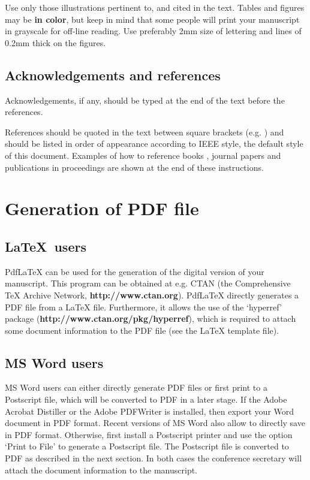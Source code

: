 \documentclass{ISMA_USD2020}
\begin{document}
Use only those illustrations pertinent to, and cited in the text. Tables and figures may be \textbf{in color}, but keep in mind that some people will print your manuscript in grayscale for off-line reading. Use preferably 2mm size of lettering and lines of 0.2mm thick on the figures. 


\subsection{Acknowledgements and references}

Acknowledgements, if any, should be typed at the end of the text before the references.

References should be quoted in the text between square brackets (e.g. \cite{heylen1997modal}) and should be listed in order of appearance according to IEEE style, the default style of this document. Examples of how to reference books \cite{heylen1997modal}, journal papers \cite{sas1995active} and publications
in proceedings \cite{boonen2001modified} are shown at the end of these instructions.

\section{Generation of PDF file \label{s:pdf}}

\subsection{\LaTeX ~users}

Pdf\LaTeX{} can be used for the generation of the digital version of your manuscript. This
program can be obtained at e.g. CTAN (the Comprehensive \TeX{} Archive Network, \textbf{http://www.ctan.org}). Pdf\LaTeX{} directly generates a PDF file from a \LaTeX{} file. Furthermore, it allows the use of the `hyperref' package (\textbf{http://www.ctan.org/pkg/hyperref}), which is required to attach some document information to the PDF file (see the \LaTeX{} template file).

\subsection{MS Word users}

MS Word users can either directly generate PDF files or first print to a Postscript file, which will be converted to PDF in a later stage. If the Adobe Acrobat Distiller or the Adobe PDFWriter is installed, then export your Word document in PDF format. Recent versions of MS Word also allow to directly save in PDF format. Otherwise, first install a Postscript printer and use the option `Print to File' to generate a Postscript file. The Postscript file is converted to PDF as described in the next section. In both cases the conference secretary will attach the document information to the manuscript.
\end{document}
